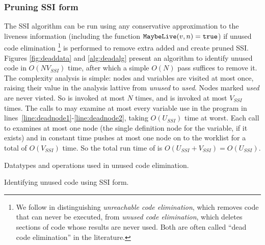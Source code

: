 \documentclass[12pt,titlepage,twoside]{article}
\begin{document}
\subsubsection{Pruning SSI form}\label{sec:unusedcode}
The SSI algorithm can be run using any conservative approximation to
the liveness information
(including the function $\texttt{MaybeLive}(v, n)=\texttt{true}$) if
unused code elimination%
\footnote{We follow \cite{wegman91:scc} in distinguishing
\emph{unreachable code elimination}, which removes code that can never
be executed, from \emph{unused code elimination}, which deletes
sections of code whose results are never used.  Both are often called
``dead code elimination'' in the literature.} is performed to remove
extra  added and create pruned SSI.
Figures \ref{fig:deaddata} and
\ref{alg:deadalg} present an algorithm to identify unused code in
$O(N V_{SSI})$ time, after which a simple $O(N)$ pass suffices to remove it.
The complexity analysis is simple: nodes and variables are visited at
most once, raising their value in the analysis lattive from
\emph{unused} to \emph{used}.  Nodes marked \emph{used} are never
visted.  So  is invoked at most $N$ times, and
 is invoked at most $V_{SSI}$ times.  The calls to
 may examine at most every variable use in the
program in lines~\ref{line:deadnode1}-\ref{line:deadnode2}, taking
$O(U_{SSI})$ time at worst. Each call
to  examines at most one node (the single
definition node for the variable, if it exists) and in constant time
pushes at most one node on to the worklist for a total of $O(V_{SSI})$ time.
So the total run time of  is
$O(U_{SSI}+V_{SSI})=O(U_{SSI})$.

\begin{myfigure}\small

\caption{Datatypes and operations used in unused code elimination.}
\label{fig:deaddata}
\end{myfigure}

\begin{myalgorithm}\small\linespread{0.75}

\caption{Identifying unused code using SSI form.}
\label{alg:deadalg}
\end{myalgorithm}
\end{document}
